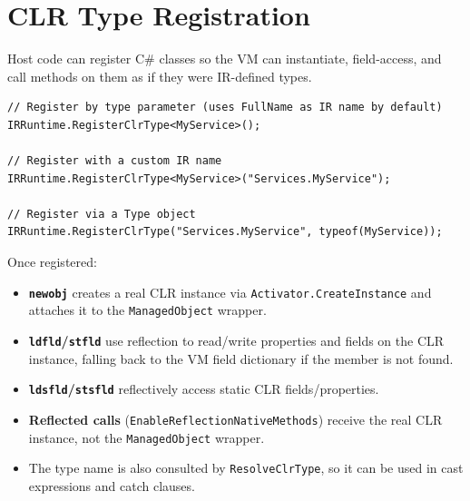 \documentclass[11pt,a4paper]{article}
\begin{document}
\section{CLR Type Registration}
\label{sec:clrtype}

Host code can register C\# classes so the VM can instantiate, field-access,
and call methods on them as if they were IR-defined types.

\begin{lstlisting}[language={[Sharp]C}]
// Register by type parameter (uses FullName as IR name by default)
IRRuntime.RegisterClrType<MyService>();

// Register with a custom IR name
IRRuntime.RegisterClrType<MyService>("Services.MyService");

// Register via a Type object
IRRuntime.RegisterClrType("Services.MyService", typeof(MyService));
\end{lstlisting}

Once registered:
\begin{itemize}
  \item \textbf{\texttt{newobj}} creates a real CLR instance via
        \texttt{Activator.CreateInstance} and attaches it to the
        \texttt{ManagedObject} wrapper.
  \item \textbf{\texttt{ldfld}/\texttt{stfld}} use reflection to
        read/write properties and fields on the CLR instance, falling
        back to the VM field dictionary if the member is not found.
  \item \textbf{\texttt{ldsfld}/\texttt{stsfld}} reflectively access
        static CLR fields/properties.
  \item \textbf{Reflected calls} (\texttt{EnableReflectionNativeMethods})
        receive the real CLR instance, not the \texttt{ManagedObject} wrapper.
  \item The type name is also consulted by \texttt{ResolveClrType}, so it
        can be used in cast expressions and catch clauses.
\end{itemize}
\end{document}

